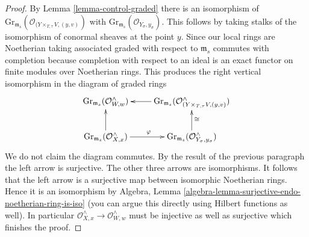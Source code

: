 \documentclass[10pt,a4paper]{amsart}
\theoremstyle{plain}
\theoremstyle{definition}
\theoremstyle{remark}
\numberwithin{equation}{subsection}
\begin{document}
\begin{proof}
\medskip\noindent
By Lemma \ref{lemma-control-graded} there is an isomorphism of
$\text{Gr}_{\mathfrak m_s}(\mathcal{O}_{(Y \times_{T, \tau} V, (y, v)})$
with
$\text{Gr}_{\mathfrak m_s}(\mathcal{O}_{Y_\sigma, y_\sigma})$.
This follows by taking stalks of the isomorphism of conormal
sheaves at the point $y$. Since our local rings are Noetherian
taking associated graded with respect to $\mathfrak m_s$
commutes with completion because completion with respect to an ideal
is an exact functor on finite modules over Noetherian rings.
This produces the right vertical isomorphism in the diagram of graded rings
$$
\xymatrix{
\text{Gr}_{\mathfrak m_s}(\mathcal{O}_{W, w}^\wedge) &
\text{Gr}_{\mathfrak m_s}
(\mathcal{O}_{(Y \times_{T, \tau} V, (y, v)}^\wedge) \ar[l] \\
\text{Gr}_{\mathfrak m_s}(\mathcal{O}_{X, x}^\wedge)
\ar[r]^\varphi \ar[u] &
\text{Gr}_{\mathfrak m_s}(\mathcal{O}_{Y_\sigma, y_\sigma}^\wedge)
\ar[u]_{\cong}
}
$$
We do not claim the diagram commutes. By the result of the previous
paragraph the left arrow is surjective. The other three arrows
are isomorphisms. It follows that the left arrow is a surjective map
between isomorphic Noetherian rings. Hence it is an isomorphism
by Algebra, Lemma \ref{algebra-lemma-surjective-endo-noetherian-ring-is-iso}
(you can argue this directly using Hilbert functions as well).
In particular $\mathcal{O}_{X, x}^\wedge \to \mathcal{O}_{W, w}^\wedge$
must be injective as well as surjective which finishes the proof.
\end{proof}
\end{document}
